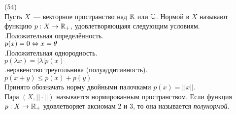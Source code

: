 (54)\\
Пусть $X$~--- векторное пространство над $\mathbb{R}$ или $\mathbb{C}$. Нормой в $X$ называют функцию $p: X\to\mathbb{R}_+$, удовлетворяющаяя следующим условиям.\\
.\q Положительная определённость.\\
$p(x) = 0 \Leftrightarrow x = \theta$\\
.\q Положительная однородность.\\
$p(\lambda x) = |\lambda|p(x)$\\
.\q неравенство треугольника (полуаддитивность).\\
$p(x + y) \le p(x) + p(y)$\\
Принято обозначать норму двойными палочками $p(x) = ||x||$.\\
Пара $(X, ||\cdot||)$ называется нормированным пространством.
Если функция $p: X\to\mathbb{R}_+$ удовлетворяет аксиомам 2 и 3, то она называется \textit{полунормой}.